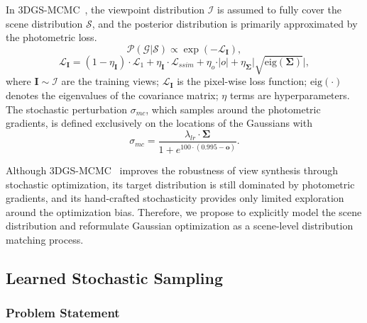 \documentclass[lettersize,journal]{IEEEtran}
\begin{document}
In 3DGS-MCMC~\cite{mcmc}, the viewpoint distribution $\mathcal{I}$ is assumed to fully cover the scene distribution $\mathcal{S}$, and the posterior distribution is primarily approximated by the photometric loss. 
\begin{equation}
    \mathcal{P}(\mathcal{G} \vert \mathcal{S}) \propto \exp \left( - \mathcal{L}_{\mathbf{I}} \right), 
    \label{eq2}
\end{equation}
\begin{equation}
    \mathcal{L}_{\mathbf{I}} = \left( 1 - \eta_{\mathbf{I}} \right) \cdot \mathcal{L}_{1} + \eta_{\mathbf{I}} \cdot \mathcal{L}_{ssim} + \eta_{o} \cdot \vert o \vert + \eta_{\mathbf{\Sigma}} \vert \sqrt{\text{eig}(\mathbf{\Sigma})} \vert, 
    \label{eq3}
\end{equation}
where $\mathbf{I} \sim \mathcal{I}$ are the training views; $\mathcal{L}_{\mathbf{I}}$ is the pixel-wise loss function; $\text{eig}(\cdot)$ denotes the eigenvalues of the covariance matrix; $\eta$ terms are hyperparameters.
The stochastic perturbation $\sigma_{mc}$, which samples around the photometric gradients, is defined exclusively on the locations of the Gaussians with 
\begin{equation}
    \sigma_{mc} = \frac{\lambda_{lr} \cdot \mathbf{\Sigma}}{1 + e^{100 \cdot \left( 0.995 - \mathbf{o} \right)}}.
    \label{eq4}
\end{equation}

Although 3DGS-MCMC~\cite{mcmc} improves the robustness of view synthesis through stochastic optimization, its target distribution is still dominated by photometric gradients, and its hand-crafted stochasticity provides only limited exploration around the optimization bias. 
Therefore, we propose to explicitly model the scene distribution and reformulate Gaussian optimization as a scene-level distribution matching process. 

\subsection{Learned Stochastic Sampling}

\subsubsection{Problem Statement}
\end{document}
